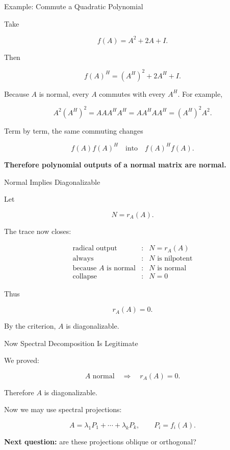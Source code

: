 \documentclass[10pt]{beamer}
\theoremstyle{definition}
\newcommand{\x}[1]{\alert{\textbf{#1}}}
\begin{document}
\begin{frame}[shrink=8]{Example: Commute a Quadratic Polynomial}

Take

$$
f(A)=A^2+2A+I.
$$

Then

$$
f(A)^H=(A^H)^2+2A^H+I.
$$

\vfill\pause

Because $A$ is normal, every $A$ commutes with every $A^H$. For example,

$$
A^2(A^H)^2=AA A^HA^H
=AA^HAA^H
=(A^H)^2A^2.
$$

\vfill\pause

Term by term, the same commuting changes

$$
f(A)f(A)^H
\quad\text{into}\quad
f(A)^Hf(A).
$$

\vfill

\x{Therefore polynomial outputs of a normal matrix are normal.}

\end{frame}


\begin{frame}[shrink=8]{Normal Implies Diagonalizable}

Let

$$
N=r_A(A).
$$

\vfill\pause

The trace now closes:

$$
\begin{array}{rcl}
\text{radical output} &:& N=r_A(A)\\[1mm]
\text{always} &:& N\text{ is nilpotent}\\[1mm]
\text{because }A\text{ is normal} &:& N\text{ is normal}\\[1mm]
\text{collapse} &:& N=0
\end{array}
$$

\vfill\pause

Thus

$$
r_A(A)=0.
$$

By the criterion, $A$ is diagonalizable.

\end{frame}


\begin{frame}{Now Spectral Decomposition Is Legitimate}

We proved:

$$
A\text{ normal}
\quad\Longrightarrow\quad
r_A(A)=0.
$$

\vfill\pause

Therefore $A$ is diagonalizable.

\vfill

Now we may use spectral projections:

$$
A=\lambda_1P_1+\cdots+\lambda_kP_k,
\qquad
P_i=f_i(A).
$$

\vfill

\x{Next question:} are these projections oblique or orthogonal?

\end{frame}
\end{document}
